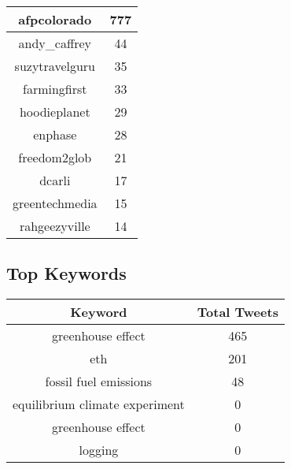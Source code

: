 \documentclass{article}\usepackage[T1]{fontenc}
\begin{document}
\begin{tabular}{|c|c|}
 \hline
afpcolorado & 777\\ 
 \hline
andy\_caffrey & 44\\ 
 \hline
suzytravelguru & 35\\ 
 \hline
farmingfirst & 33\\ 
 \hline
hoodieplanet & 29\\ 
 \hline
enphase & 28\\ 
 \hline
freedom2glob & 21\\ 
 \hline
dcarli & 17\\ 
 \hline
greentechmedia & 15\\ 
 \hline
rahgeezyville & 14\\ 
 \hline
\end{tabular}\subsection*{Top Keywords}\begin{tabular}{|c|c|}         \hline         Keyword & Total Tweets \\ 
 \hline
greenhouse effect & 465\\ 
 \hline
eth & 201\\ 
 \hline
fossil fuel emissions & 48\\ 
 \hline
equilibrium climate experiment & 0\\ 
 \hline
greenhouse effect & 0\\ 
 \hline
logging & 0\\ 
 \hline
\end{tabular}
\end{document}
